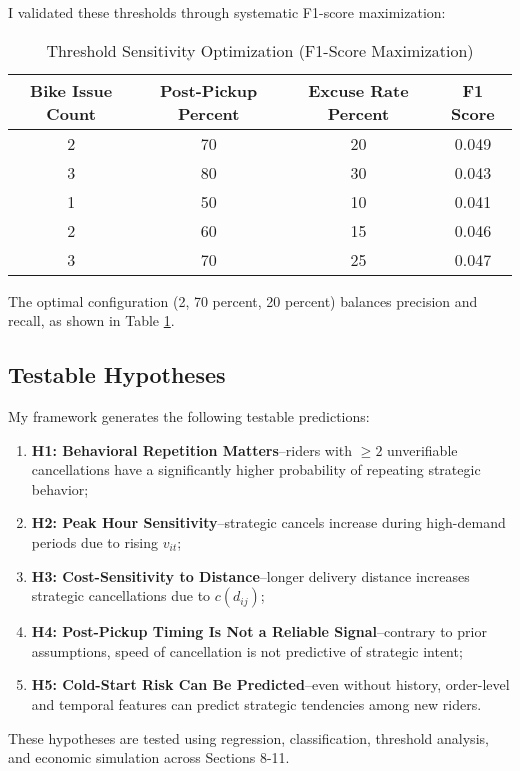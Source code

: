 \documentclass[12pt,letterpaper]{article}
\begin{document}
I validated these thresholds through systematic F1-score maximization:

\begin{table}[H]
\centering
\caption{Threshold Sensitivity Optimization (F1-Score Maximization)}
\label{tab:threshold_opt}
\begin{tabular}{cccc}
\toprule
Bike Issue Count & Post-Pickup Percent & Excuse Rate Percent & F1 Score \\
\midrule
2 & 70 & 20 & 0.049 \\
3 & 80 & 30 & 0.043 \\
1 & 50 & 10 & 0.041 \\
2 & 60 & 15 & 0.046 \\
3 & 70 & 25 & 0.047 \\
\bottomrule
\end{tabular}
\end{table}

The optimal configuration (2, 70 percent, 20 percent) balances precision and recall, as shown in Table \ref{tab:threshold_opt}.

\subsection{Testable Hypotheses}

My framework generates the following testable predictions:

\begin{enumerate}
    \item \textbf{H1: Behavioral Repetition Matters}--riders with $\geq 2$ unverifiable cancellations have a significantly higher probability of repeating strategic behavior;
    \item \textbf{H2: Peak Hour Sensitivity}--strategic cancels increase during high-demand periods due to rising $v_{it}$;
    \item \textbf{H3: Cost-Sensitivity to Distance}--longer delivery distance increases strategic cancellations due to $c(d_{ij})$;
    \item \textbf{H4: Post-Pickup Timing Is Not a Reliable Signal}--contrary to prior assumptions, speed of cancellation is not predictive of strategic intent;
    \item \textbf{H5: Cold-Start Risk Can Be Predicted}--even without history, order-level and temporal features can predict strategic tendencies among new riders.
\end{enumerate}

These hypotheses are tested using regression, classification, threshold analysis, and economic simulation across Sections 8-11.
\end{document}
